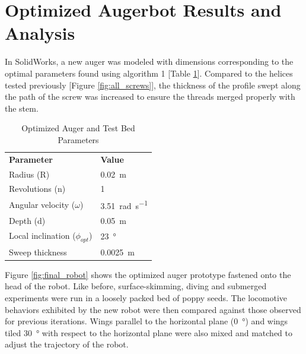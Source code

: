\documentclass[letterpaper, 11 pt]{article}
\begin{document}
\section{Optimized Augerbot Results and Analysis}
In SolidWorks, a new auger was modeled with dimensions corresponding to the optimal parameters found using algorithm 1 [Table \ref{optParamTable}]. Compared to the helices tested previously [Figure \ref{fig:all_screws}], the thickness of the profile swept along the path of the screw was increased to ensure the threads merged properly with the stem.   

\begin{table}[H] 
\begin{center}
\caption{Optimized Auger and Test Bed Parameters}
	\begin{tabular}{ l l}
	\textbf{Parameter} & \textbf{Value} \\
	Radius (R) & \SI{0.02}{\m} \\
	Revolutions (n) & 1 \\
	Angular velocity ($\omega$) & \SI{3.51}{\radian\per\s} \\
	Depth (d) & \SI{0.05}{\m}\\  
	Local inclination ($\phi_{opt}$) & \SI{23}{\degree}\\
	Sweep thickness & \SI{0.0025}{\m}
	\end{tabular}
	\label{optParamTable}
\end{center}
\end{table}

\medskip
Figure \ref{fig:final_robot} shows the optimized auger prototype fastened onto the head of the robot. Like before, surface-skimming, diving and submerged experiments were run in a loosely packed bed of poppy seeds. The locomotive behaviors exhibited by the new robot were then compared against those observed for previous iterations. Wings parallel to the horizontal plane (\SI{0}{\degree}) and wings tiled \SI{30}{\degree} with respect to the horizontal plane were also mixed and matched to adjust the trajectory of the robot.  
\end{document}
